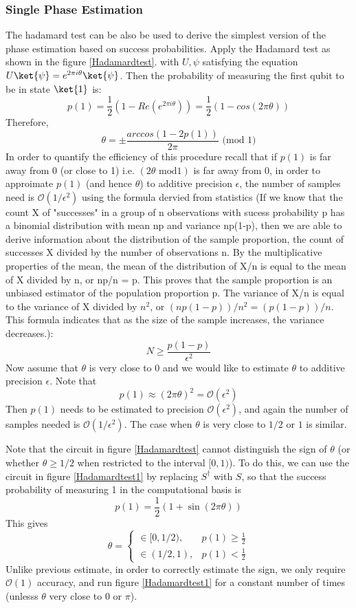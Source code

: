\documentclass[12pt, oneside]{book}
\theoremstyle{definition}
\theoremstyle{definition}
\theoremstyle{remark}
\begin{document}
\subsubsection{Single Phase Estimation}
The hadamard test can be also be used to derive the simplest version of the phase estimation based on success probabilities.
Apply the Hadamard test as shown in the figure \ref{Hadamardtest}. with $U,\psi$ satisfying the equation $U\ket{\psi}=e^{2\pi i \theta}\ket{\psi}$.
Then the probability of measuring the first qubit to be in state $\ket{1}$ is:
\[
p(1)=\frac{1}{2}(1-Re(e^{2\pi i \theta}))=\frac{1}{2}(1-cos(2\pi \theta))
\]
Therefore,
\[
\theta=\pm\frac{arccos(1-2p(1))}{2\pi} \text{ (mod 1)}
\]
In order to quantify the efficiency of this procedure recall that if $p(1)$ is far away from 0 (or close to 1) i.e. 
$(2\theta \text{ mod} 1)$ is far away from 0, in order to approimate $p(1)$ (and hence $\theta$) to additive precision $\epsilon$, the
number of samples need is $\mathcal{O}(1/\epsilon^2)$ using the formula 
dervied from statistics (If we know that the count X of "successes" in a group of n 
observations with sucess probability p has a binomial distribution with mean np and 
variance np(1-p), then we are able to derive information about the distribution of 
the sample proportion, the count of successes X divided by the number of 
observations n. By the multiplicative properties of the mean, the mean of the 
distribution of X/n is equal to the mean of X divided by n, or np/n = p. This proves 
that the sample proportion  is an unbiased estimator of the population proportion p. 
The variance of X/n is equal to the variance of X 
divided by $n^2$, or $(np(1-p))/n^2 = (p(1-p))/n $. 
This formula indicates that as the size of the sample increases, the variance decreases.):
\[
    N\geq \frac{p(1-p)}{\epsilon^2}
\] 
Now assume that $\theta$ is very close to 0 and we would like to estimate $\theta$ 
to additive precision $\epsilon$. Note that 
\[
p(1)\approx (2\pi\theta)^2=\mathcal{O}(\epsilon^2)
\]
Then $p(1)$ needs to be estimated to precision $\mathcal{O}(\epsilon^2)$, and again the number of samples needed is $\mathcal{O}(1/\epsilon^2)$.
The case when $\theta$ is very close to $1/2$ or $1$ is similar.

Note that the circuit in figure \ref{Hadamardtest} cannot distinguish the sign of $\theta$ (or whether $\theta \geq 1/2$
when restricted to the interval $[0,1)$). To do this, we can use the circuit in figure \ref{Hadamardtest1}
by replacing $S^{\dagger}$ with $S$, so that the success probability of measuring 1 in the computational basis is
\[
p(1)=\frac{1}{2}(1+\sin (2\pi\theta))
\]
This gives
\[
\theta = \begin{cases} \in [0,1/2), &p(1)\geq \frac{1}{2} \\ \in (1/2,1), & p(1)<\frac{1}{2}\end{cases}
\]
Unlike previous estimate, in order to correctly estimate the sign, we only require $\mathcal{O}(1)$ 
accuracy, and run figure \ref{Hadamardtest1} for a constant number of times (unlesss $\theta$ very close to $0$ or $\pi$).
\end{document}
